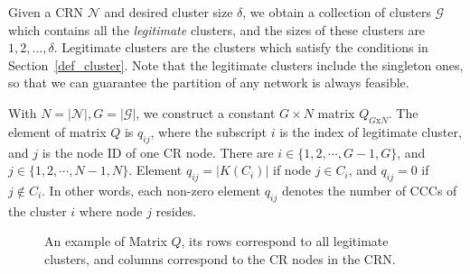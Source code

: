 \documentclass[10pt,journal,compsoc]{IEEEtran}
\theoremstyle{mytheoremstyle}
\theoremstyle{mytheoremstyle}
\theoremstyle{mytheoremstyle}
\newcommand{\bigO}{\ensuremath{\mathcal{O}}}%
\begin{document}




Given a CRN $\mathcal{N}$ and desired cluster size $\delta$, we obtain a collection of clusters $\mathcal{G}$ which contains all the \textit{legitimate} clusters, and the sizes of these clusters are $1,2,\ldots,\delta$.
Legitimate clusters are the clusters which satisfy the conditions in Section~\ref{def_cluster}. 
Note that the legitimate clusters include the singleton ones, so that we can guarantee the partition of any network is always feasible.

With $N=|\mathcal{N}|, G=|\mathcal{G}|$, we construct a constant $G\times N$ matrix $Q_{G\text{x}N}$. 
The element of matrix $Q$ is $q_{ij}$, where the subscript $i$ is the index of legitimate cluster, and $j$ is the node ID of one CR node.
There are $i\in \{1,2,\cdots,G-1, G\}$, and $j\in \{1,2,\cdots,N-1, N\}$.
Element $q_{ij}= |K(C_i)|$ if node $j\in C_i$, and $q_{ij}= 0$ if $j\notin C_i$.
In other words, each non-zero element $q_{ij}$ denotes the number of CCCs of the cluster $i$ where node $j$ resides.

\begin{figure}[ht!]
\centering
{}	
\caption{An example of Matrix $Q$, its rows correspond to all legitimate clusters, and columns correspond to the CR nodes in the CRN.}
\label{xx}
\end{figure}
\end{document}
